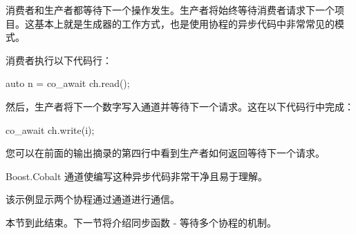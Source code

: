 消费者和生产者都等待下一个操作发生。生产者将始终等待消费者请求下一个项目。这基本上就是生成器的工作方式，也是使用协程的异步代码中非常常见的模式。

消费者执行以下代码行：

\begin{cpp}
auto n = co_await ch.read();
\end{cpp}

然后，生产者将下一个数字写入通道并等待下一个请求。这在以下代码行中完成：

\begin{cpp}
co_await ch.write(i);
\end{cpp}

您可以在前面的输出摘录的第四行中看到生产者如何返回等待下一个请求。

Boost.Cobalt 通道使编写这种异步代码非常干净且易于理解。

该示例显示两个协程通过通道进行通信。

本节到此结束。下一节将介绍同步函数 - 等待多个协程的机制。








